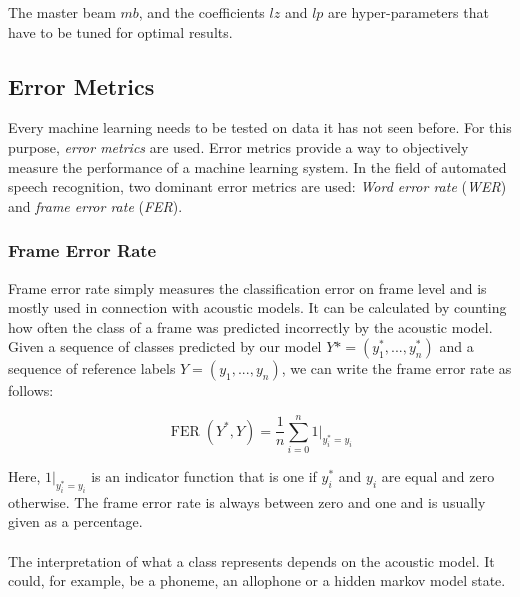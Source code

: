 The master beam $mb$, and the coefficients $lz$ and $lp$ are hyper-parameters that have to be tuned for optimal results. 

\subsection{Error Metrics}
Every machine learning needs to be tested on data it has not seen before. For this purpose, \textit{error metrics} are used. Error metrics provide a way to objectively measure the performance of a machine learning system. In the field of automated speech recognition, two dominant error metrics are used: \textit{Word error rate} (\textit{WER}) and \textit{frame error rate} (\textit{FER}).

\subsubsection{Frame Error Rate}
Frame error rate simply measures the classification error on frame level and is mostly used in connection with acoustic models. It can be calculated by counting how often the class of a frame was predicted incorrectly by the acoustic model. Given a sequence of classes predicted by our model $Y* = (y^*_1, ..., y^*_n)$ and a sequence of reference labels $Y = (y_1, ..., y_n)$, we can write the frame error rate as follows:

\[
\operatorname{FER}(Y^*, Y) = \frac{1}{n} \sum_{i = 0}^n 1|_{y^*_i = y_i} 
\]

Here, $1|_{y^*_i = y_i}$ is an indicator function that is one if $y^*_i$ and $y_i$ are equal and zero otherwise. The frame error rate is always between zero and one and is usually given as a percentage. 
\\ \\ 
The interpretation of what a class represents depends on the acoustic model. It could, for example, be a phoneme, an allophone or a hidden markov model state. 

